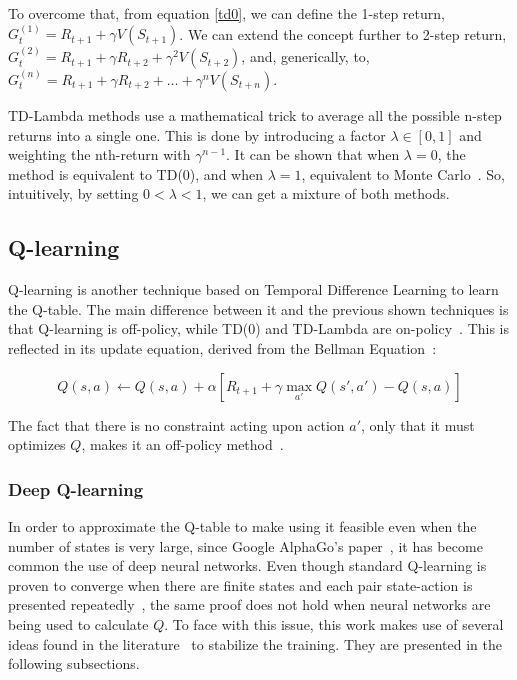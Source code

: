 \documentclass[11pt,twoside]{article}
\begin{document}
To overcome that, from equation \ref{td0}, we can define the 1-step return, $G_t^{(1)} = R_{t+1} + \gamma V(S_{t+1})$. We can extend the concept further to 2-step return, $G_t^{(2)} = R_{t+1} + \gamma R_{t+2} + \gamma^2 V(S_{t+2})$, and, generically, to, $G_t^{(n)} = R_{t+1} + \gamma R_{t+2} + \ldots + \gamma^n V(S_{t+n})$. 

TD-Lambda methods use a mathematical trick to average all the possible n-step returns into a single one. This is done by introducing a factor $\lambda \in [0, 1]$ and weighting the nth-return with $\gamma^{n-1}$. It can be shown that when $\lambda = 0$, the method is equivalent to TD(0), and when $\lambda = 1$, equivalent to Monte Carlo~\cite{dp_approx}. So, intuitively, by setting $0 < \lambda < 1$, we can get a mixture of both methods.

\subsection{Q-learning}

Q-learning is another technique based on Temporal Difference Learning to learn the Q-table. The main difference between it and the previous shown techniques is that Q-learning is off-policy, while TD(0) and TD-Lambda are on-policy~\cite{sutton}. This is reflected in its update equation, derived from the Bellman Equation~\cite{qlearning}:

\begin{equation} \label{qlearning}
	Q(s, a) \leftarrow Q(s, a) + \alpha [R_{t+1} + \gamma \max_{a'} Q(s', a') - Q(s,a)]
\end{equation}

The fact that there is no constraint acting upon action $a'$, only that it must optimizes $Q$, makes it an off-policy method~\cite{qlearning}.

\subsubsection{Deep Q-learning}

In order to approximate the Q-table to make using it feasible even when the number of states is very large, since Google AlphaGo's paper~\cite{alphago}, it has become common the use of deep neural networks. Even though standard Q-learning is proven to converge when there are finite states and each pair state-action is presented repeatedly~\cite{convergence_qlearning}, the same proof does not hold when neural networks are being used to calculate $Q$. To face with this issue, this work makes use of several ideas found in the literature~\cite{replay} to stabilize the training. They are presented in the following subsections.
\end{document}
